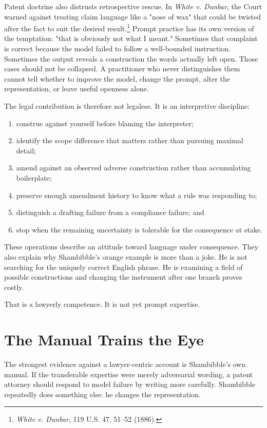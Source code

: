 \documentclass[11pt]{article}
\begin{document}
Patent doctrine also distrusts retrospective rescue. In \textit{White v. Dunbar}, the Court warned against treating claim language like a "nose of wax" that could be twisted after the fact to suit the desired result.\footnote{\textit{White v. Dunbar}, 119 U.S. 47, 51--52 (1886).} Prompt practice has its own version of the temptation: "that is obviously not what I meant." Sometimes that complaint is correct because the model failed to follow a well-bounded instruction. Sometimes the output reveals a construction the words actually left open. Those cases should not be collapsed. A practitioner who never distinguishes them cannot tell whether to improve the model, change the prompt, alter the representation, or leave useful openness alone.

The legal contribution is therefore not legalese. It is an interpretive discipline:

\begin{enumerate}[label=\arabic*.]
\item construe against yourself before blaming the interpreter;
\item identify the scope difference that matters rather than pursuing maximal detail;
\item amend against an observed adverse construction rather than accumulating boilerplate;
\item preserve enough amendment history to know what a rule was responding to;
\item distinguish a drafting failure from a compliance failure; and
\item stop when the remaining uncertainty is tolerable for the consequence at stake.
\end{enumerate}

These operations describe an attitude toward language under consequence. They also explain why Shambibble's orange example is more than a joke. He is not searching for the uniquely correct English phrase. He is examining a field of possible constructions and changing the instrument after one branch proves costly.

That is a lawyerly competence. It is not yet prompt expertise.

\section{The Manual Trains the Eye}

The strongest evidence against a lawyer-centric account is Shambibble's own manual. If the transferable expertise were merely adversarial wording, a patent attorney should respond to model failure by writing more carefully. Shambibble repeatedly does something else: he changes the representation.
\end{document}
